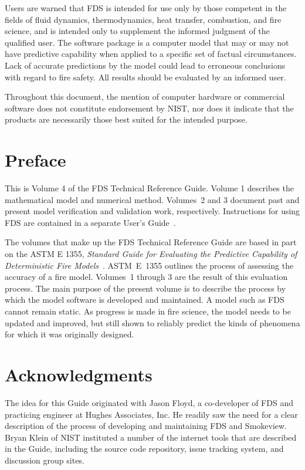 \documentclass[11pt]{book}
\begin{document}
Users are warned that FDS is intended for use only by those competent
in the fields of fluid dynamics, thermodynamics, heat transfer, combustion, and fire science,
and is intended only to supplement the informed judgment of the qualified user.
The software package is a computer model that may or may not have predictive
capability when applied to a specific set of factual circumstances.
Lack of accurate predictions by the model could lead to erroneous
conclusions with regard to fire safety. All results should be evaluated by an informed user.

Throughout this document, the mention of computer hardware or commercial
software does not constitute endorsement by NIST, nor does it indicate that
the products are necessarily those best suited for the intended purpose.

\chapter{Preface}

This is Volume 4 of the FDS Technical Reference Guide. Volume 1 describes the mathematical model and numerical method. Volumes~2 and 3 document past and
present model verification and validation work, respectively. Instructions for using FDS are contained in a separate User's Guide~\cite{FDS_Users_Guide}.

The volumes that make up the FDS Technical Reference Guide are based in part on the ASTM E 1355, {\em Standard Guide for Evaluating the Predictive Capability of
Deterministic Fire Models}~\cite{ASTM:E1355}. ASTM~E~1355 outlines the process of assessing the accuracy of a fire model. Volumes~1 through 3 are the
result of this evaluation process. The main purpose of the present volume is to describe the process by which the model software is developed and maintained. A model such
as FDS cannot remain static. As progress is made in fire science, the model needs to be updated and improved, but still shown to reliably predict the kinds of
phenomena for which it was originally designed.



\chapter{Acknowledgments}

\label{acksection}

The idea for this Guide originated with Jason Floyd, a co-developer of FDS and practicing engineer at Hughes Associates, Inc. He readily saw the need
for a clear description of the process of developing and maintaining FDS and Smokeview. Bryan Klein of NIST instituted a number of the internet tools that
are described in the Guide, including the source code repository, issue tracking system, and discussion group sites.
\end{document}
